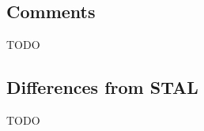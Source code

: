 \begin{mathpar}
\end{mathpar}

\begin{mathpar}
\end{mathpar}

\subsection{Comments}

TODO

\subsection{Differences from STAL}

TODO
